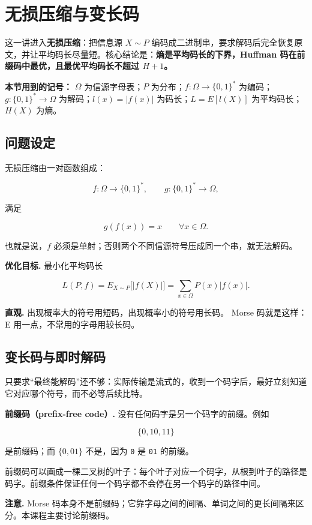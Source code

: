 \section{无损压缩与变长码}


这一讲进入\textbf{无损压缩}：把信息源 $X\sim P$ 编码成二进制串，要求解码后完全恢复原文，并让平均码长尽量短。核心结论是：\textbf{熵是平均码长的下界，Huffman 码在前缀码中最优，且最优平均码长不超过 $H+1$。}

\textbf{本节用到的记号：} $\Omega$ 为信源字母表；$P$ 为分布；$f:\Omega\to\{0,1\}^*$ 为编码；$g:\{0,1\}^*\to\Omega$ 为解码；$l(x)=|f(x)|$ 为码长；$L=E[l(X)]$ 为平均码长；$H(X)$ 为熵。

\subsection{问题设定}


无损压缩由一对函数组成：

\[
f:\Omega\to\{0,1\}^*,\qquad g:\{0,1\}^*\to\Omega,
\]

满足

\[
g(f(x))=x\qquad\forall x\in\Omega.
\]

也就是说，$f$ 必须是单射；否则两个不同信源符号压成同一个串，就无法解码。

\textbf{优化目标.} 最小化平均码长

\[
L(P,f)=E_{X\sim P}\bigl[|f(X)|\bigr]
=\sum_{x\in\Omega}P(x)|f(x)|.
\]

\textbf{直观.} 出现概率大的符号用短码，出现概率小的符号用长码。 Morse 码就是这样：E 用一点，不常用的字母用较长码。

\subsection{变长码与即时解码}


只要求“最终能解码”还不够：实际传输是流式的，收到一个码字后，最好立刻知道它对应哪个符号，而不必等后续比特。

\textbf{前缀码（prefix-free code）.} 没有任何码字是另一个码字的前缀。例如

\[
\{0,10,11\}
\]

是前缀码；而 $\{0,01\}$ 不是，因为 \texttt{0} 是 \texttt{01} 的前缀。

前缀码可以画成一棵二叉树的叶子：每个叶子对应一个码字，从根到叶子的路径是码字。前缀条件保证任何一个码字都不会停在另一个码字的路径中间。

\textbf{注意.} Morse 码本身不是前缀码；它靠字母之间的间隔、单词之间的更长间隔来区分。本课程主要讨论前缀码。

